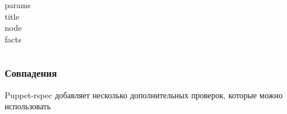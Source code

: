 \begin{description}
\item[params]
\item[title]
\item[node]
\item[facts] 
\end{description}

\begin{lstlisting}

\end{lstlisting}

\subsubsection{Совпадения}

Puppet-rspec добавляет несколько дополнительных проверок, которые можно использовать 

